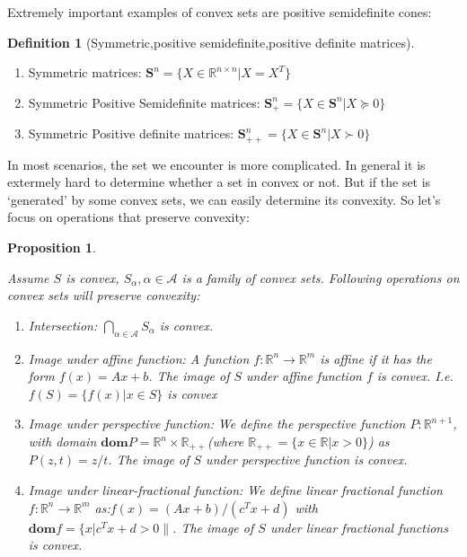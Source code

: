 \documentclass[
]{book}
\providecommand{\tightlist}{%
  \setlength{\itemsep}{0pt}\setlength{\parskip}{0pt}}
\newtheorem{proposition}{Proposition}[chapter]
\theoremstyle{definition}
\newtheorem{definition}{Definition}[chapter]
\theoremstyle{definition}
\theoremstyle{definition}
\theoremstyle{definition}
\theoremstyle{remark}
\begin{document}
Extremely important examples of convex sets are positive semidefinite cones:

\begin{definition}[Symmetric,positive semidefinite,positive definite matrices]
\protect\hypertarget{def:symmetricmatrices}{}\label{def:symmetricmatrices}\leavevmode

\begin{enumerate}
\def\labelenumi{\arabic{enumi}.}
\tightlist
\item
  Symmetric matrices: \(\textbf{S}^n = \{X\in\mathbb{R}^{n\times n}| X=X^T\}\)
\item
  Symmetric Positive Semidefinite matrices: \(\textbf{S}_+^n = \{X\in\textbf{S}^n| X\succeq0\}\)
\item
  Symmetric Positive definite matrices: \(\textbf{S}_{++}^n = \{X\in\textbf{S}^n| X\succ0\}\)
\end{enumerate}

\end{definition}

In most scenarios, the set we encounter is more complicated. In general it is extermely hard to determine whether a set in convex or not. But if the set is `generated' by some convex sets, we can easily determine its convexity. So let's focus on operations that preserve convexity:

\begin{proposition}
\protect\hypertarget{prp:operationpreserveconvexity}{}\label{prp:operationpreserveconvexity}

Assume \(S\) is convex, \(S_\alpha,\alpha\in\mathcal{A}\) is a family of convex sets. Following operations on convex sets will preserve convexity:

\begin{enumerate}
\def\labelenumi{\arabic{enumi}.}
\item
  Intersection: \(\bigcap_{\alpha\in\mathcal{A}}S_\alpha\) is convex.
\item
  Image under affine function: A function \(f:\mathbb{R}^n\to\mathbb{R}^m\) is affine if it has the form \(f(x) = Ax+b\). The image of \(S\) under affine function \(f\) is convex. I.e. \(f(S) = \{f(x)|x\in S\}\) is convex
\item
  Image under perspective function: We define the perspective function \(P:\mathbb{R}^{n+1}\), with domain \(\textbf{dom}P = \mathbb{R}^n\times \mathbb{R}_{++}\)(where \(\mathbb{R}_{++}=\{x\in \mathbb{R}|x>0\}\)) as \(P(z,t) = z/t\). The image of \(S\) under perspective function is convex.
\item
  Image under linear-fractional function: We define linear fractional function \(f:\mathbb{R}^n\to\mathbb{R}^m\) as:\(f(x) = (Ax+b)/(c^Tx+d)\) with \(\textbf{dom}f = \{x|c^Tx+d>0\|\). The image of \(S\) under linear fractional functions is convex.
\end{enumerate}

\end{proposition}
\end{document}

